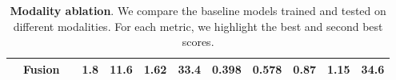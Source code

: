 \begin{table}[H]
{\begin{tabular}{llH|ccccccccc}
 & \textbf{Fusion} &  &  1.8 & 11.6 & 1.62 &  33.4 &  0.398 &  0.578 & 0.87 & 1.15 & 34.6 \\
\bottomrule
\end{tabular}
}
\caption{\textbf{Modality ablation}. We compare the baseline models trained and tested on different modalities. For each metric, we highlight the \colorbox{blue!25}{best} and \colorbox{blue!10}{second best} scores.}
\label{tab:modality_ablation}
\end{table}